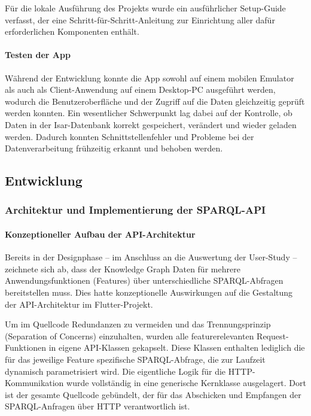 Für die lokale Ausführung des Projekts wurde ein ausführlicher Setup-Guide verfasst, der eine Schritt-für-Schritt-Anleitung zur Einrichtung aller dafür erforderlichen Komponenten enthält.

\paragraph{Testen der App}

Während der Entwicklung konnte die App sowohl auf einem mobilen Emulator als auch als Client-Anwendung auf einem Desktop-PC ausgeführt werden, wodurch die Benutzeroberfläche und der Zugriff auf die Daten gleichzeitig geprüft werden konnten. Ein wesentlicher Schwerpunkt lag dabei auf der Kontrolle, ob Daten in der Isar-Datenbank korrekt gespeichert, verändert und wieder geladen werden. Dadurch konnten Schnittstellenfehler und Probleme bei der Datenverarbeitung frühzeitig erkannt und behoben werden.


\subsection{Entwicklung}
\subsubsection{Architektur und Implementierung der SPARQL-API}
\label{sec:api-sparql}
\paragraph{Konzeptioneller Aufbau der API-Architektur}

Bereits in der Designphase -- im Anschluss an die Auswertung der User-Study -- zeichnete sich ab, dass der Knowledge Graph Daten für mehrere Anwendungsfunktionen (Features) über unterschiedliche SPARQL-Abfragen bereitstellen muss. Dies hatte konzeptionelle Auswirkungen auf die Gestaltung der API-Architektur im Flutter-Projekt.

Um im Quellcode Redundanzen zu vermeiden und das Trennungsprinzip (Separation of Concerns) einzuhalten, wurden alle featurerelevanten Request-Funktionen in eigene API-Klassen gekapselt. Diese Klassen enthalten lediglich die für das jeweilige Feature spezifische SPARQL-Abfrage, die zur Laufzeit dynamisch parametrisiert wird. Die eigentliche Logik für die HTTP-Kommunikation wurde vollständig in eine generische Kernklasse ausgelagert. Dort ist der gesamte Quellcode gebündelt, der für das Abschicken und Empfangen der SPARQL-Anfragen über HTTP verantwortlich ist.

